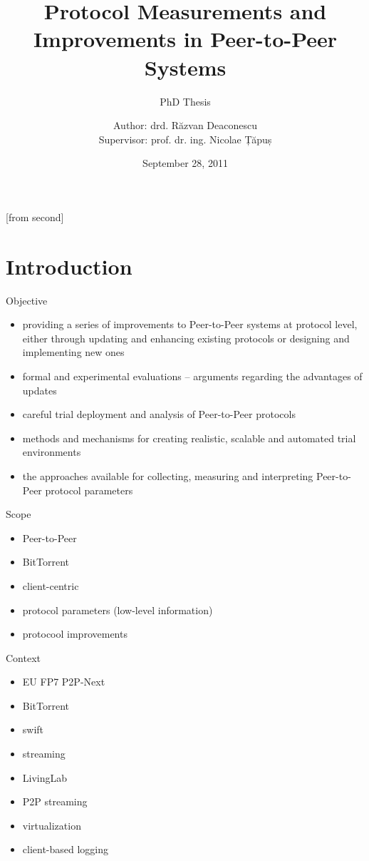 \documentclass{beamer}
\title[Protocol Measurements and Improvements in Peer-to-Peer
Systems]{Protocol Measurements and Improvements in Peer-to-Peer Systems}
\subtitle{PhD Thesis}
\institute[CSE, ACS, UPB]{University POLITEHNICA of Bucharest}
\author[Răzvan Deaconescu]{Author: drd. Răzvan Deaconescu\\
Supervisor: prof. dr. ing. Nicolae Țăpuș}
\date{September 28, 2011}
\begin{document}
[from second]


\frame{\titlepage}

\section{Introduction}

\begin{frame}{Objective}
  \begin{itemize}
    \item providing a series of improvements to Peer-to-Peer systems at
    protocol level, either through updating and enhancing existing protocols
    or designing and implementing new ones
    \item formal and experimental evaluations -- arguments regarding the
    advantages of updates
    \item careful trial deployment and analysis of Peer-to-Peer protocols
    \item methods and mechanisms for creating realistic, scalable and
    automated trial environments
    \item the approaches available for collecting, measuring and interpreting
    Peer-to-Peer protocol parameters
  \end{itemize}
\end{frame}

\begin{frame}{Scope}
  \begin{itemize}
    \item Peer-to-Peer
    \item BitTorrent
    \item client-centric
    \item protocol parameters (low-level information)
    \item protocool improvements
  \end{itemize}
\end{frame}

\begin{frame}{Context}
  \begin{itemize}
    \item EU FP7 P2P-Next
    \item BitTorrent
    \item swift
    \item streaming
    \item LivingLab
    \item P2P streaming
    \item virtualization
    \item client-based logging
  \end{itemize}
\end{frame}
\end{document}
